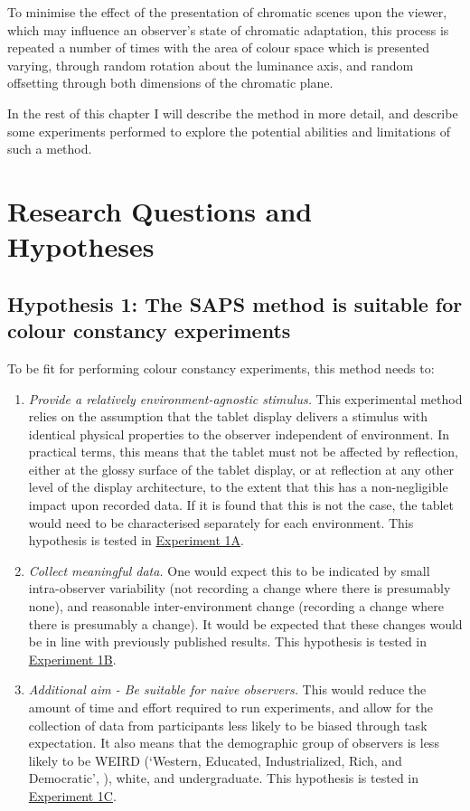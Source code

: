 To minimise the effect of the presentation of chromatic scenes upon the viewer, which may influence an observer's state of chromatic adaptation, this process is repeated a number of times with the area of colour space which is presented varying, through random rotation about the luminance axis, and random offsetting through both dimensions of the chromatic plane.

In the rest of this chapter I will describe the method in more detail, and describe some experiments performed to explore the potential abilities and limitations of such a method.

\section{Research Questions and Hypotheses} \label{sec:qandhyp}

\subsection*{Hypothesis 1: The \gls{SAPS} method is suitable for colour constancy experiments}

To be fit for performing colour constancy experiments, this method needs to:

\begin{enumerate}[label=\Alph*.]
    \item \label{list:hyp1a} \emph{Provide a relatively environment-agnostic stimulus.} 
    This experimental method relies on the assumption that the tablet display delivers a stimulus with identical physical properties to the observer independent of environment. In practical terms, this means that the tablet must not be affected by reflection, either at the glossy surface of the tablet display, or at reflection at any other level of the display architecture, to the extent that this has a non-negligible impact upon recorded data. If it is found that this is not the case, the tablet would need to be characterised separately for each environment. This hypothesis is tested in \hyperref[sec:exp1a]{Experiment 1A}.
    \item \label{list:hyp1b} \emph{Collect meaningful data.} 
    One would expect this to be indicated by small intra-observer variability (not recording a change where there is presumably none), and reasonable inter-environment change (recording a change where there is presumably a change). It would be expected that these changes would be in line with previously published results. This hypothesis is tested in \hyperref[sec:exp1b]{Experiment 1B}.
    \item \label{list:hyp1c} \emph{Additional aim - Be suitable for naive observers.}
    This would reduce the amount of time and effort required to run experiments, and allow for the collection of data from participants less likely to be biased through task expectation. It also means that the demographic group of observers is less likely to be 
    WEIRD (`Western, Educated, Industrialized, Rich, and Democratic', \citep{henrich_weirdest_2010,brookshire_social_2013,justsaysinweird_just_2019}), white, and undergraduate. This hypothesis is tested in \hyperref[sec:exp1c]{Experiment 1C}.
\end{enumerate}

